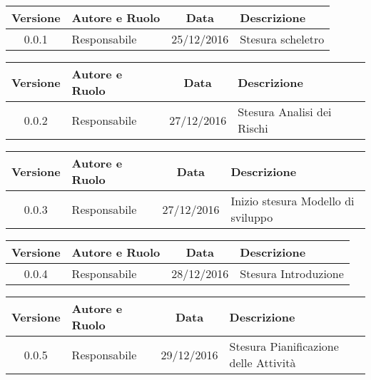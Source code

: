 
\begin{center}
	\begin{tabular}{cp{3cm}cp{3cm}}
	\textbf{Versione} & \textbf{Autore e Ruolo} & \textbf{Data} & \textbf{Descrizione} \\ \hline
	0.0.1 & {\LB} Responsabile & 25/12/2016 & Stesura scheletro \\ \hline
	\end{tabular}
\end{center}
\begin{center}
	\begin{tabular}{cp{3cm}cp{3cm}}
	\textbf{Versione} & \textbf{Autore e Ruolo} & \textbf{Data} & \textbf{Descrizione} \\ \hline
	0.0.2 & {\PB} Responsabile & 27/12/2016 & Stesura Analisi dei Rischi\\ \hline
	\end{tabular}
\end{center}
\begin{center}
	\begin{tabular}{cp{3cm}cp{3cm}}
	\textbf{Versione} & \textbf{Autore e Ruolo} & \textbf{Data} & \textbf{Descrizione} \\ \hline
	0.0.3 & {\LB} Responsabile & 27/12/2016 & Inizio stesura Modello di sviluppo\\ \hline
	\end{tabular}
\end{center}
\begin{center}
	\begin{tabular}{cp{3cm}cp{3cm}}
	\textbf{Versione} & \textbf{Autore e Ruolo} & \textbf{Data} & \textbf{Descrizione} \\ \hline
	0.0.4 & {\PB} Responsabile & 28/12/2016 &  Stesura Introduzione  \\ \hline
	\end{tabular}
\end{center}
\begin{center}
	\begin{tabular}{cp{3cm}cp{3cm}}
	\textbf{Versione} & \textbf{Autore e Ruolo} & \textbf{Data} & \textbf{Descrizione} \\ \hline
	0.0.5 & {\PB} Responsabile & 29/12/2016 &  Stesura Pianificazione delle Attività  \\ \hline
	\end{tabular}
\end{center}